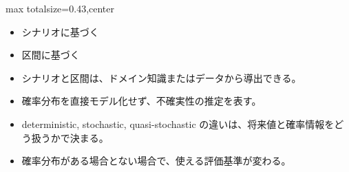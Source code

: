 \clearpage
{}
\begin{minipage}[t]{0.405\textwidth}
\begin{adjustbox}{max totalsize={\textwidth}{0.43\textheight},center}
\begin{minipage}{\textwidth}\scriptsize
{}\begin{itemize}
\item シナリオに基づく
\item 区間に基づく
\item シナリオと区間は、ドメイン知識またはデータから導出できる。
\item 確率分布を直接モデル化せず、不確実性の推定を表す。
\end{itemize}\begin{itemize}
\item deterministic, stochastic, quasi-stochastic の違いは、将来値と確率情報をどう扱うかで決まる。
\item 確率分布がある場合とない場合で、使える評価基準が変わる。
\end{itemize}
\end{minipage}
\end{adjustbox}
\end{minipage}\hfill
